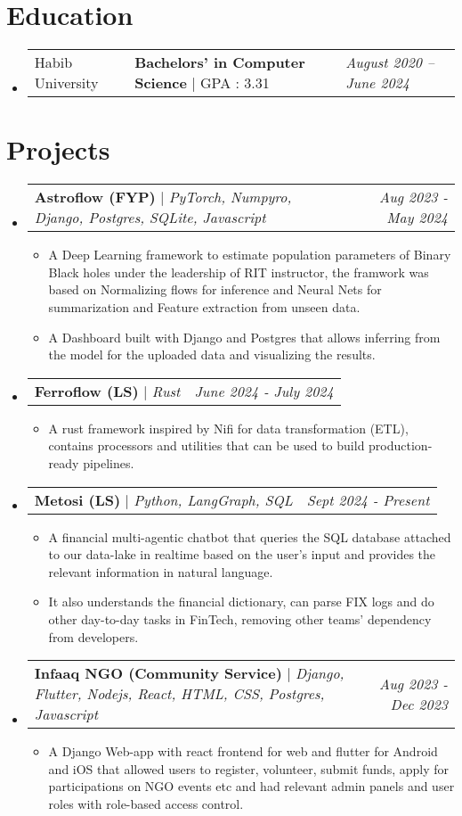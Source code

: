 \documentclass[letterpaper,10pt]{article}
\makeatletter
\newcommand{\subheadingtitlevspace}{
\vspace{-3pt}
}
\newcommand{\resumeItem}[1]{
  \item{
    {#1 \vspace{-4pt}}
  }
}
\newcommand{\titleItem}[1]{
  \textbf{#1}
}
\newcommand{\resumeSubheading}[4]{
  \item
     \begin{tabular*}{0.97\textwidth}[t]{l@{\extracolsep{\fill}}l@{}l}     
      {#1} & \titleItem{#3} | {#2} & \textit{#4}\\
    \end{tabular*}\vspace{-10pt}
}
\newcommand{\resumeProjectHeading}[2]{
    \item
    \begin{tabular*}{0.97\textwidth}{l@{\extracolsep{\fill}}r}
      #1 & \textit{ #2} \\
    \end{tabular*}\vspace{-9pt}
}
\newcommand{\resumeSubHeadingListStart}{\subheadingtitlevspace\begin{itemize}[leftmargin=0.15in, label={}]}
\newcommand{\resumeSubHeadingListEnd}{\end{itemize}}
\newcommand{\resumeItemListStart}{
\begin{itemize}}
\newcommand{\resumeItemListEnd}{
\vspace{4pt}
\end{itemize}\vspace{-8pt}}
\makeatother
\begin{document}
\section{Education}
\resumeSubHeadingListStart
\resumeSubheading
{Habib University}{GPA : 3.31}
{Bachelors' in Computer Science}{August 2020 -- June 2024}
\resumeSubHeadingListEnd
\vspace{-8pt}


\section{Projects}
\resumeSubHeadingListStart
\resumeProjectHeading
{\titleItem{Astroflow (FYP)} $|$ \emph{PyTorch, Numpyro, Django, Postgres, SQLite,
Javascript}}{Aug 2023 - May 2024}
\resumeItemListStart
\resumeItem{A Deep Learning framework to estimate population parameters of
Binary Black holes under the leadership of RIT instructor, the framwork was
based on Normalizing flows for inference and Neural Nets for summarization and
Feature extraction from unseen data.}
\resumeItem{A Dashboard built with Django and Postgres that allows inferring
from the model for the uploaded data and visualizing the results.}
\resumeItemListEnd
\resumeProjectHeading
{\titleItem{Ferroflow (LS)} $|$ \emph{Rust}}{June 2024 - July 2024}
\resumeItemListStart
\resumeItem{A rust framework inspired by Nifi for data transformation (ETL),
contains processors and utilities that can be used to build production-ready
pipelines.}
\resumeItemListEnd
\resumeProjectHeading
{\titleItem{Metosi (LS)} $|$ \emph{Python, LangGraph, SQL}}{Sept 2024 - Present}
\resumeItemListStart
\resumeItem{A financial multi-agentic chatbot that queries the SQL database
attached to our data-lake in realtime based on the user's input and provides
the relevant information in natural language.}
\resumeItem{It also understands the financial dictionary, can parse FIX logs
and do other day-to-day tasks in FinTech, removing other teams' dependency from
developers.}
\resumeItemListEnd
\resumeProjectHeading
{\titleItem{Infaaq NGO (Community Service)} $|$ \emph{Django, Flutter, Nodejs, React,
HTML, CSS, Postgres, Javascript}}{Aug 2023 - Dec 2023}
\resumeItemListStart
\resumeItem{A Django Web-app with react frontend for web and flutter for
Android and iOS that allowed users to register, volunteer, submit funds, apply
for participations on NGO events etc and had relevant admin panels and user
roles with role-based access control.}
\resumeItemListEnd
\resumeSubHeadingListEnd

\end{document}
